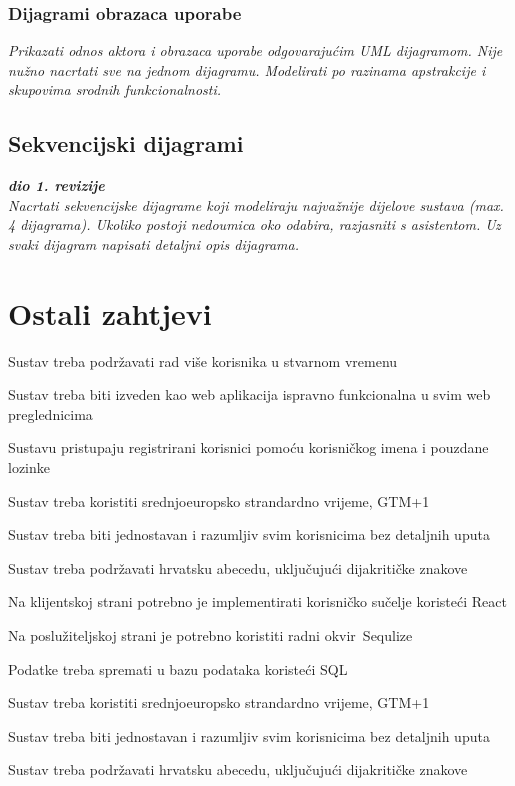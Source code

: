 					
				\subsubsection{Dijagrami obrazaca uporabe}
					
					\textit{Prikazati odnos aktora i obrazaca uporabe odgovarajućim UML dijagramom. Nije nužno nacrtati sve na jednom dijagramu. Modelirati po razinama apstrakcije i skupovima srodnih funkcionalnosti.}
				\eject		
				
			\subsection{Sekvencijski dijagrami}
				
				\textbf{\textit{dio 1. revizije}}\\
				
				\textit{Nacrtati sekvencijske dijagrame koji modeliraju najvažnije dijelove sustava (max. 4 dijagrama). Ukoliko postoji nedoumica oko odabira, razjasniti s asistentom. Uz svaki dijagram napisati detaljni opis dijagrama.}
				\eject
	
		\section{Ostali zahtjevi}
		
			\begin{packed_item}

				\item Sustav treba podržavati rad više korisnika u stvarnom vremenu
				\item Sustav treba biti izveden kao web aplikacija ispravno funkcionalna u svim web preglednicima
				\item	 Sustavu pristupaju registrirani korisnici pomoću korisničkog imena i pouzdane lozinke
				\item Sustav treba koristiti srednjoeuropsko strandardno vrijeme, GTM+1
				\item Sustav treba biti jednostavan i razumljiv svim korisnicima bez detaljnih uputa
				\item Sustav treba podržavati hrvatsku abecedu, uključujući dijakritičke znakove
				\item Na klijentskoj strani potrebno je implementirati korisničko sučelje koristeći React
				\item Na poslužiteljskoj strani je potrebno koristiti radni okvir Sequlize
				\item Podatke treba spremati u bazu podataka koristeći SQL
				\item Sustav treba koristiti srednjoeuropsko strandardno vrijeme, GTM+1
				\item Sustav treba biti jednostavan i razumljiv svim korisnicima bez detaljnih uputa
				\item Sustav treba podržavati hrvatsku abecedu, uključujući dijakritičke znakove
			\end{packed_item}

			 
			 
	
